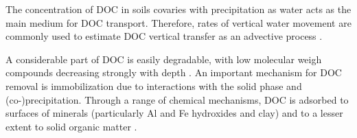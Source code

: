 \documentclass[11pt, oneside, a4paper]{article}   	%
\begin{document}
The concentration of DOC in soils covaries with precipitation \citep{Liu2021} as water acts as the main medium for DOC transport. Therefore, rates of vertical water movement are commonly used to estimate DOC vertical transfer as an advective process \citep{Ota2013}. 

A considerable part of DOC is easily degradable, with low molecular weigh compounds decreasing strongly with depth \citep{Roth2019}.  An important mechanism for DOC removal
is immobilization due to interactions with the solid phase and (co-)precipitation.
Through a range of chemical mechanisms, DOC is adsorbed to surfaces of minerals (particularly Al and Fe hydroxides and clay) and to a lesser extent to solid organic
matter \citep{Neff2001, Kalbitz2008}.



\end{document}
